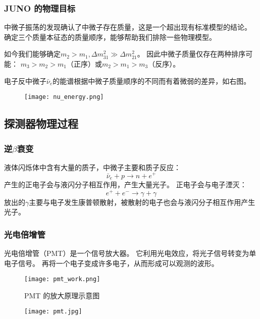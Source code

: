 \documentclass[aspectratio=169]{beamer}
\begin{document}
\begin{frame}
    \frametitle{JUNO 的物理目标}

    \begin{multicols}{2}
        中微子振荡的发现确认了中微子存在质量，这是一个超出现有标准模型的结论。
        确定三个质量本征态的质量顺序，能够帮助我们排除一些物理模型。

        如今我们能够确定$m_2>m_1,\Delta m_{31}^2 \gg \Delta m_{21}^2$。
        因此中微子质量仅存在两种排序可能：
        $m_3>m_2>m_1$（正序）或$m_2>m_1>m_3$（反序）。

        电子反中微子$\bar{\nu}_e$的能谱根据中微子质量顺序的不同而有着微弱的差异，如右图。
        \columnbreak
        \begin{figure}
            \centering
            \texttt{[image: nu\_energy.png]}
        \end{figure}
    \end{multicols}

\end{frame}
\subsection{探测器物理过程}
\begin{frame}
    \frametitle{逆$\beta$衰变}

    液体闪烁体中含有大量的质子，中微子主要和质子反应：
    \begin{equation*}
        \bar{\nu}_e+p\to n+e^+
    \end{equation*}
    产生的正电子会与液闪分子相互作用，产生大量光子。
    正电子会与电子湮灭：
    \begin{equation*}
        e^+ +e^-\to\gamma+\gamma
    \end{equation*}
    放出的$\gamma$主要与电子发生康普顿散射，被散射的电子也会与液闪分子相互作用产生光子。

\end{frame}

\begin{frame}
    \frametitle{光电倍增管}

    \begin{multicols}{2}
        光电倍增管（PMT）是一个信号放大器。
        它利用光电效应，将光子信号转变为单电子信号。
        再将一个电子变成许多电子，从而形成可以观测的波形。

        \begin{figure}
            \centering
            \texttt{[image: pmt\_work.png]}
            \caption{PMT 的放大原理示意图}
        \end{figure}
        \columnbreak
        \begin{figure}
            \centering
            \texttt{[image: pmt.jpg]}
        \end{figure}
    \end{multicols}

\end{frame}
\end{document}
